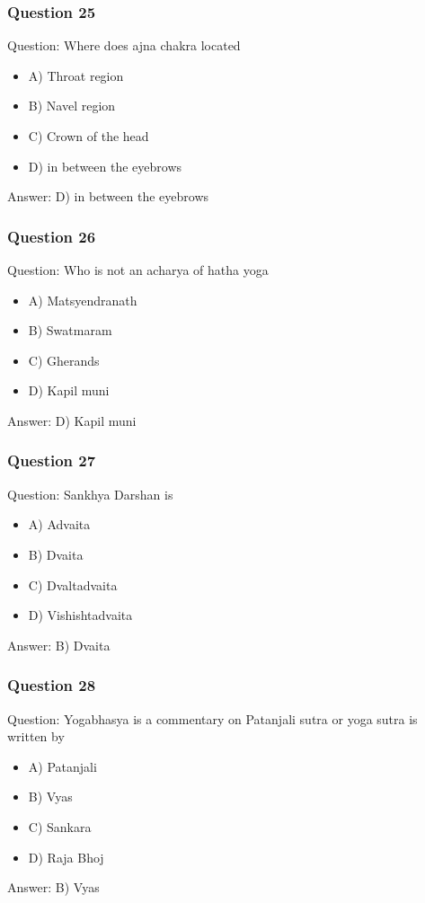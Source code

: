 \begin{frame}[fragile]\frametitle{Question 25}
Question: Where does ajna chakra located
\begin{itemize}
\item A) Throat region
\item B) Navel region
\item C) Crown of the head
\item D) in between the eyebrows
\end{itemize}
Answer: D) in between the eyebrows
\end{frame}

\begin{frame}[fragile]\frametitle{Question 26}
Question: Who is not an acharya of hatha yoga
\begin{itemize}
\item A) Matsyendranath
\item B) Swatmaram
\item C) Gherands
\item D) Kapil muni
\end{itemize}
Answer: D) Kapil muni
\end{frame}

\begin{frame}[fragile]\frametitle{Question 27}
Question: Sankhya Darshan is
\begin{itemize}
\item A) Advaita
\item B) Dvaita
\item C) Dvaltadvaita
\item D) Vishishtadvaita
\end{itemize}
Answer: B) Dvaita
\end{frame}

\begin{frame}[fragile]\frametitle{Question 28}
Question: Yogabhasya is a commentary on Patanjali sutra or yoga sutra is written by
\begin{itemize}
\item A) Patanjali
\item B) Vyas
\item C) Sankara
\item D) Raja Bhoj
\end{itemize}
Answer: B) Vyas
\end{frame}

